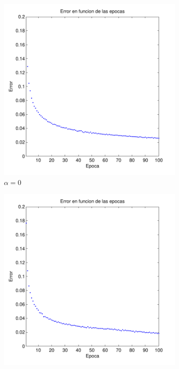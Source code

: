 \documentclass[informe.tex]{subfiles}
\begin{document}
    \begin{figure}[H]
        \centering
        \begin{subfigure}[b]{0.30\textwidth}
                \includegraphics[width=\textwidth]{graficos/cmp_momentum_0.pdf}
                \caption{$\alpha = 0$}
                \label{fig:cmp_momentum_0}
        \end{subfigure}
        \begin{subfigure}[b]{0.30\textwidth}
                \includegraphics[width=\textwidth]{graficos/cmp_momentum_07.pdf}

\end{subfigure}
\end{figure}
\end{document}
